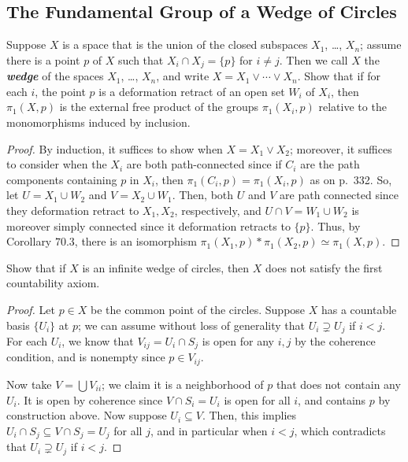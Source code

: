 \documentclass[12pt]{article}
\theoremstyle{remark}
\begin{document}
\setcounter{subsection}{70}
\subsection{The Fundamental Group of a Wedge of Circles}
\setcounter{subsubsection}{1}
\begin{problem}\label{exc:71.2}
  Suppose $X$ is a space that is the union of the closed subspaces $X_1$,
  \ldots, $X_n$; assume there is a point $p$ of $X$ such that $X_i \cap X_j =
  \{p\}$ for $i \ne j$. Then we call $X$ the \emph{\textbf{wedge}} of the spaces
  $X_1$, \ldots, $X_n$, and write $X = X_1 \vee \cdots \vee X_n$. Show that if
  for each $i$, the point $p$ is a deformation retract of an open set $W_i$ of
  $X_i$, then $\pi_1(X,p)$ is the external free product of the groups
  $\pi_1(X_i,p)$ relative to the monomorphisms induced by inclusion.
\end{problem}
\begin{proof}
  By induction, it suffices to show when $X = X_1 \vee X_2$; moreover, it
  suffices to consider when the $X_i$ are both path-connected since if $C_i$
  are the path components containing $p$ in $X_i$, then
  $\pi_1(C_i,p) = \pi_1(X_i,p)$ as on p.~332. So, let $U = X_1 \cup
  W_2$ and $V = X_2 \cup W_1$. Then, both $U$ and $V$ are path connected since
  they deformation retract to $X_1,X_2$, respectively, and $U \cap V = W_1 \cup
  W_2$ is moreover simply connected since it deformation retracts to $\{p\}$.
  Thus, by Corollary $70.3$, there is an isomorphism
  $\pi_1(X_1,p) * \pi_1(X_2,p) \simeq \pi_1(X,p)$.
\end{proof}

\setcounter{subsubsection}{3}
\begin{problem}\label{exc:71.4}
  Show that if $X$ is an infinite wedge of circles, then $X$ does not satisfy the first countability axiom.
\end{problem}
\begin{proof}
  Let $p \in X$ be the common point of the circles. Suppose $X$ has a countable basis $\{U_i\}$ at $p$; we can assume without loss of generality that $U_i \supsetneq U_j$ if $i < j$. For each $U_i$, we know that $V_{ij} = U_i \cap S_j$ is open for any $i,j$ by the coherence condition, and is nonempty since $p \in V_{ij}$.
  \par Now take $V = \bigcup V_{ii}$; we claim it is a neighborhood of $p$ that does not contain any $U_i$. It is open by coherence since $V \cap S_i = U_i$ is open for all $i$, and contains $p$ by construction above. Now suppose $U_i \subseteq V$. Then, this implies $U_i \cap S_j \subseteq V \cap S_j = U_j$ for all $j$, and in particular when $i < j$, which contradicts that $U_i \supsetneq U_j$ if $i < j$.
\end{proof}
\end{document}
